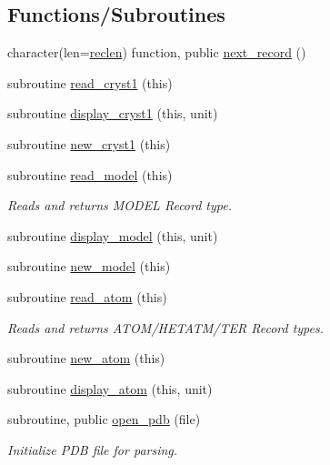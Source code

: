 \subsection*{Functions/\+Subroutines}
\begin{DoxyCompactItemize}
\item 
character(len=\hyperlink{namespacemolreader_a8f12be3272b946fd698c9fbaf2ba9d32}{reclen}) function, public \hyperlink{namespacemolreader_af6c857ef51f99971a66b1c293d24906b}{next\+\_\+record} ()
\item 
subroutine \hyperlink{namespacemolreader_af85c1b386f0dc78ebf55e003b4f8c83a}{read\+\_\+cryst1} (this)
\item 
subroutine \hyperlink{namespacemolreader_ac9a2b0ff287faa780311cc432b866610}{display\+\_\+cryst1} (this, unit)
\item 
subroutine \hyperlink{namespacemolreader_ac284dc33f40874d6156c1cd36781002c}{new\+\_\+cryst1} (this)
\item 
subroutine \hyperlink{namespacemolreader_a64ff990dc05c01debc1138dd012f4bcb}{read\+\_\+model} (this)
\begin{DoxyCompactList}\small\item\em Reads and returns M\+O\+D\+EL Record type. \end{DoxyCompactList}\item 
subroutine \hyperlink{namespacemolreader_a462d061944b74f7145b8bf89fc3439fc}{display\+\_\+model} (this, unit)
\item 
subroutine \hyperlink{namespacemolreader_a8edb660b2e1b64a5d78593c734afbe95}{new\+\_\+model} (this)
\item 
subroutine \hyperlink{namespacemolreader_a49ccaf345b633e27f69ad7a5a8637a2a}{read\+\_\+atom} (this)
\begin{DoxyCompactList}\small\item\em Reads and returns A\+T\+O\+M/\+H\+E\+T\+A\+T\+M/\+T\+ER Record types. \end{DoxyCompactList}\item 
subroutine \hyperlink{namespacemolreader_ae1000e1ea4e46f858a3640c08563c3ff}{new\+\_\+atom} (this)
\item 
subroutine \hyperlink{namespacemolreader_adb757da4ec2256578422254dad5b262e}{display\+\_\+atom} (this, unit)
\item 
subroutine, public \hyperlink{namespacemolreader_a38a3903d901bc5e0b318bcc0dfd1b3ff}{open\+\_\+pdb} (file)
\begin{DoxyCompactList}\small\item\em Initialize P\+DB file for parsing. \end{DoxyCompactList}\item 

\end{DoxyCompactItemize}
